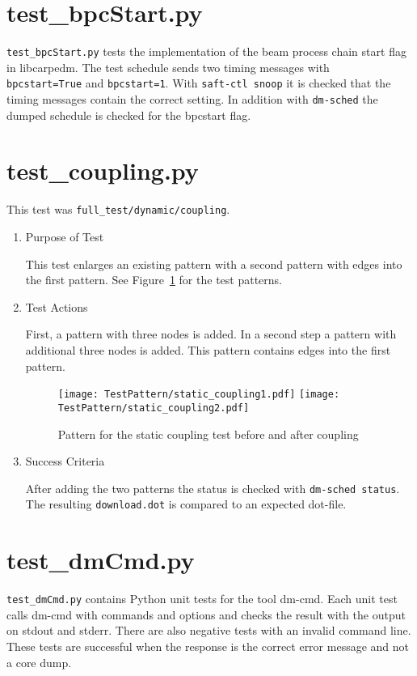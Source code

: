 \documentclass[12pt,a4paper]{report}
\begin{document}
\section{test\_bpcStart.py}
\texttt{test\_bpcStart.py} tests the implementation of the beam process chain start flag in libcarpedm.
The test schedule sends two timing messages with \\
\texttt{bpcstart=True} and \texttt{bpcstart=1}.
With \texttt{saft-ctl snoop} it is checked that the timing messages contain the correct setting.
In addition with \texttt{dm-sched} the dumped schedule is checked for the bpcstart flag.
\section{test\_coupling.py}
This test was \texttt{full\_test/dynamic/coupling}.
\begin{enumerate}
  \item Purpose of Test

  This test enlarges an existing pattern with a second pattern with edges into the first
  pattern. See Figure~\ref{fig:Pattern_for_the_static_coupling_test} for the test patterns.
  \item Test Actions

  First, a pattern with three nodes is added. In a second step a pattern with additional three nodes is added.
  This pattern contains edges into the first pattern.
    \begin{figure}
        \centering
        \texttt{[image: TestPattern/static\_coupling1.pdf]}
        \texttt{[image: TestPattern/static\_coupling2.pdf]}
        \caption{Pattern for the static coupling test before and after coupling}
        \label{fig:Pattern_for_the_static_coupling_test}
    \end{figure}
  \item Success Criteria

  After adding the two patterns the status is checked with \texttt{dm-sched status}. The resulting \texttt{download.dot} is
  compared to an expected dot-file.
\end{enumerate}

\section{test\_dmCmd.py}
\texttt{test\_dmCmd.py} contains Python unit tests for the tool dm-cmd.
Each unit test calls dm-cmd with commands and options and checks the result
with the output on stdout and stderr. There are also negative tests with
an invalid command line. These tests are successful when the response is
the correct error message and not a core dump.
\end{document}
